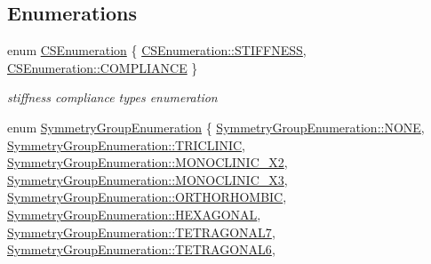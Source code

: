 \subsection*{Enumerations}
\begin{DoxyCompactItemize}
\item 
enum \mbox{\hyperlink{namespacempc_1_1core_ad3e8e7d43bfc9202d954d999f7d5c991}{C\+S\+Enumeration}} \{ \mbox{\hyperlink{namespacempc_1_1core_ad3e8e7d43bfc9202d954d999f7d5c991aa231c1d74fe18f9e82224588887d1971}{C\+S\+Enumeration\+::\+S\+T\+I\+F\+F\+N\+E\+SS}}, 
\mbox{\hyperlink{namespacempc_1_1core_ad3e8e7d43bfc9202d954d999f7d5c991a185bd2ffef1962ade3c0889c62cee500}{C\+S\+Enumeration\+::\+C\+O\+M\+P\+L\+I\+A\+N\+CE}}
 \}
\begin{DoxyCompactList}\small\item\em stiffness compliance types enumeration \end{DoxyCompactList}\item 
enum \mbox{\hyperlink{namespacempc_1_1core_a9d979684062547055a0ef5c13077bad8}{Symmetry\+Group\+Enumeration}} \{ \newline
\mbox{\hyperlink{namespacempc_1_1core_a9d979684062547055a0ef5c13077bad8ab50339a10e1de285ac99d4c3990b8693}{Symmetry\+Group\+Enumeration\+::\+N\+O\+NE}}, 
\mbox{\hyperlink{namespacempc_1_1core_a9d979684062547055a0ef5c13077bad8a049b6e2743d57033eacaea302ca6710a}{Symmetry\+Group\+Enumeration\+::\+T\+R\+I\+C\+L\+I\+N\+IC}}, 
\mbox{\hyperlink{namespacempc_1_1core_a9d979684062547055a0ef5c13077bad8a7eb6e11f17e97fbe9fc371a72a989b96}{Symmetry\+Group\+Enumeration\+::\+M\+O\+N\+O\+C\+L\+I\+N\+I\+C\+\_\+\+X2}}, 
\mbox{\hyperlink{namespacempc_1_1core_a9d979684062547055a0ef5c13077bad8ab31f5171fdded777eb3112da45967b57}{Symmetry\+Group\+Enumeration\+::\+M\+O\+N\+O\+C\+L\+I\+N\+I\+C\+\_\+\+X3}}, 
\newline
\mbox{\hyperlink{namespacempc_1_1core_a9d979684062547055a0ef5c13077bad8a45ddba8b47424b406a313caed88b091a}{Symmetry\+Group\+Enumeration\+::\+O\+R\+T\+H\+O\+R\+H\+O\+M\+B\+IC}}, 
\mbox{\hyperlink{namespacempc_1_1core_a9d979684062547055a0ef5c13077bad8a5d7adeeaa10073a6a3c5bd970a7f958b}{Symmetry\+Group\+Enumeration\+::\+H\+E\+X\+A\+G\+O\+N\+AL}}, 
\mbox{\hyperlink{namespacempc_1_1core_a9d979684062547055a0ef5c13077bad8aea4a27c3d1e79d6a65ab91e165ba6d73}{Symmetry\+Group\+Enumeration\+::\+T\+E\+T\+R\+A\+G\+O\+N\+A\+L7}}, 
\mbox{\hyperlink{namespacempc_1_1core_a9d979684062547055a0ef5c13077bad8a63dabd41a700b44f934a19db4e0f8f83}{Symmetry\+Group\+Enumeration\+::\+T\+E\+T\+R\+A\+G\+O\+N\+A\+L6}}, 
\newline

\end{DoxyCompactItemize}
